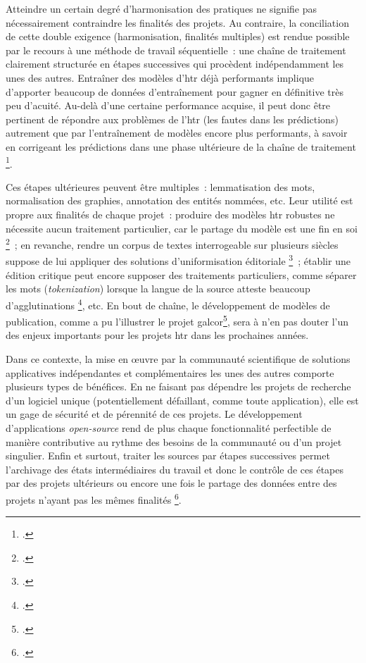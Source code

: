 \documentclass[a4paper,12pt,twoside]{book}
\begin{document}
				Atteindre un certain degré d'harmonisation des pratiques ne signifie pas
				nécessairement contraindre les finalités des projets. Au contraire, la
				conciliation de cette double exigence (harmonisation, finalités
				multiples) est rendue possible par le recours à une méthode de travail
				séquentielle~: une chaîne de traitement clairement structurée en étapes
				successives qui procèdent indépendamment les unes des autres. Entraîner
				des modèles d'\gls{htr} déjà performants implique d'apporter beaucoup de
				données d'entraînement pour gagner en définitive très peu d'acuité.
				Au-delà d'une certaine performance acquise, il peut donc être pertinent
				de répondre aux problèmes de l'\gls{htr} (les fautes dans les \glspl{prédiction})
				autrement que par l'entraînement de modèles encore plus performants, à
				savoir en corrigeant les \glspl{prédiction} dans une phase ultérieure de la chaîne de traitement
				\footcite{torresaguilarModelisationAffinageHTR2022}.
				
				Ces étapes ultérieures peuvent être multiples~: lemmatisation des mots,
				normalisation des graphies, annotation des entités nommées, etc. Leur
				utilité est propre aux finalités de chaque projet~: produire des modèles
				\gls{htr} robustes ne nécessite aucun traitement particulier, car le partage
				du modèle est une fin en soi
				\footcite{campsCremmaLabProjectsTranscription2022}~; en revanche, rendre un
				corpus de textes interrogeable sur plusieurs siècles suppose de lui
				appliquer des solutions d'uniformisation éditoriale
				\footcite{bizais-lilligExperimentationsPourAnalyse2022, torresaguilarModelisationAffinageHTR2022}~; 
				établir une édition
				critique peut encore supposer des traitements particuliers, comme
				séparer les mots (\textit{tokenization}) lorsque la langue de la source
				atteste beaucoup d'agglutinations
				\footcite{stoklbenezraHTRCriticalEdition2022}, etc.
				En bout de chaîne, le
				développement de modèles de publication, comme a pu l'illustrer le
				projet \gls{galcor}\footcite{gabaySegmOntoControlledVocabulary2022}, sera à n'en pas douter l'un des enjeux importants pour les projets \gls{htr} dans les prochaines années.
				
				Dans ce contexte, la mise en œuvre par la communauté scientifique de
				solutions applicatives indépendantes et complémentaires les unes des
				autres comporte plusieurs types de bénéfices. En ne faisant pas dépendre
				les projets de recherche d'un logiciel unique (potentiellement
				défaillant, comme toute application), elle est un gage de sécurité et de
				pérennité de ces projets. Le développement d'applications
				\textit{open-source} rend de plus chaque fonctionnalité perfectible de
				manière contributive au rythme des besoins de la communauté ou d'un
				projet singulier. Enfin et surtout, traiter les sources par étapes
				successives permet l'archivage des états intermédiaires du travail et
				donc le contrôle de ces étapes par des projets ultérieurs ou encore une
				fois le partage des données entre des projets n'ayant pas les mêmes
				finalités
				\footcite{campsCremmaLabProjectsTranscription2022}.
	
\end{document}

